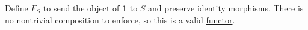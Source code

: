 Define $F_S$ to send the object of \textbf{1} to $S$ and preserve identity morphisms. There is no nontrivial composition to enforce, so this is a valid \hyperref[D3.35]{functor}.
